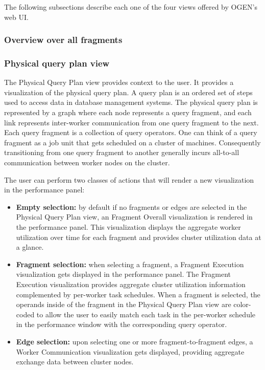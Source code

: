 \documentclass{chi2009}
\newcommand*{\system}{OGEN\xspace}
\newcommand*{\graph}{Physical Query Plan\xspace}
\newcommand*{\fragment}{Fragment Execution\xspace}
\newcommand*{\network}{Worker Communication\xspace}
\newcommand*{\overall}{Fragment Overall\xspace}
\begin{document}
The following subsections describe each one of the four views offered by \system's web UI.



\subsubsection{Overview over all fragments}
\label{sec:fragments}



\subsubsection{Physical query plan view}


The \graph view provides context to the user. It provides a visualization of the physical query plan. A query plan is an ordered set of steps used to access data in database management systems. The physical query plan is represented by a graph where each node represents a query fragment, and each link represents inter-worker communication from one query fragment to the next. Each query fragment is a collection of query operators. One can think of a query fragment as a job unit that gets scheduled on a cluster of machines. Consequently transitioning from one query fragment to another generally incurs all-to-all communication between worker nodes on the cluster. 

The user can perform two classes of actions that will render a new visualization in the performance panel:
\begin{itemize}

    \item \textbf{Empty selection:} by default if no fragments or edges are selected in the \graph view, an \overall visualization is rendered in the performance panel. This visualization displays the aggregate worker utilization over time for each fragment and provides cluster utilization data at a glance.
    \item \textbf{Fragment selection:} when selecting a fragment, a \fragment visualization gets displayed in the performance panel. The \fragment visualization provides aggregate cluster utilization information complemented by per-worker task schedules. When a fragment is selected, the operands inside of the fragment in the \graph view are color-coded to allow the user to easily match each task in the per-worker schedule in the performance window with the corresponding query operator.
    \item \textbf{Edge selection:} upon selecting one or more fragment-to-fragment edges, a \network visualization gets displayed, providing aggregate exchange data between cluster nodes.
    
\end{itemize}
\end{document}
